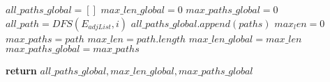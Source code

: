 \State $all\_paths\_global = []$
\State $max\_len\_global = 0$
\State $max\_paths\_global = 0$
    \State $all\_path = DFS(E_{adjList}, i)$
    \State $all\_paths\_global.append(paths)$
        \State $max_len = 0$
                \State $max\_paths = path$
                \State $max\_len = path.length$
            \EndIf
        \EndFor
            \State $max\_len\_global = max\_len$
            \State $max\_paths\_global = max\_paths$
        \EndIf
    \EndIf
\EndFor

\State \textbf{return} $all\_paths\_global, max\_len\_global, max\_paths\_global$

\EndProcedure
